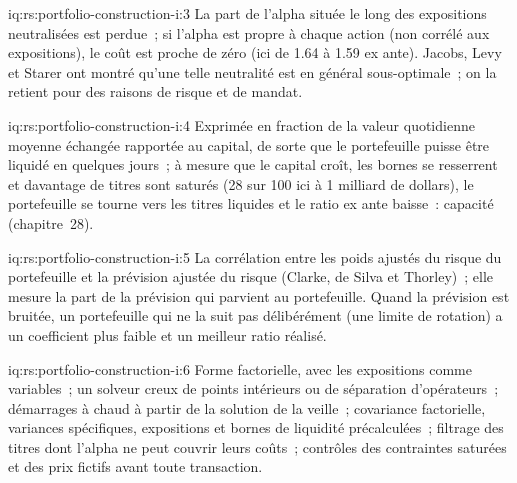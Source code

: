 \begin{solution}{iq:rs:portfolio-construction-i:3}
La part de l'alpha située le long des expositions neutralisées est perdue~; si l'alpha est propre à chaque action (non corrélé aux expositions), le coût est proche de zéro
(ici de 1.64 à 1.59 ex ante). Jacobs, Levy et Starer ont montré qu'une telle neutralité est en général sous-optimale~; on la retient pour des raisons de risque et de mandat.
\end{solution}

\begin{solution}{iq:rs:portfolio-construction-i:4}
Exprimée en fraction de la valeur quotidienne moyenne échangée rapportée au capital, de sorte que le portefeuille puisse être liquidé en quelques jours~; à mesure que le capital croît, les bornes se resserrent et davantage de titres sont saturés
(28 sur 100 ici à 1 milliard de dollars), le portefeuille se tourne vers les titres liquides et le ratio ex ante baisse~: capacité (chapitre~28).
\end{solution}

\begin{solution}{iq:rs:portfolio-construction-i:5}
La corrélation entre les poids ajustés du risque du portefeuille et la prévision ajustée du risque (Clarke, de Silva et Thorley)~; elle mesure la part de la prévision qui parvient au
portefeuille. Quand la prévision est bruitée, un portefeuille qui ne la suit pas délibérément (une limite de rotation) a un coefficient plus faible et un meilleur ratio réalisé.
\end{solution}

\begin{solution}{iq:rs:portfolio-construction-i:6}
Forme factorielle, avec les expositions comme variables~; un solveur creux de points intérieurs ou de séparation d'opérateurs~; démarrages à chaud à partir de la solution de la veille~; covariance factorielle,
variances spécifiques, expositions et bornes de liquidité précalculées~; filtrage des titres dont l'alpha ne peut couvrir leurs coûts~; contrôles des contraintes saturées et des
prix fictifs avant toute transaction.
\end{solution}
